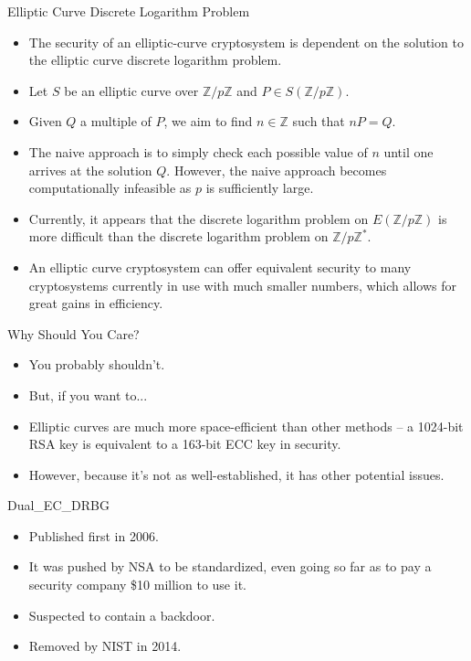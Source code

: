 \documentclass{beamer}
\begin{document}
	\begin{frame}{Elliptic Curve Discrete Logarithm Problem}
		\begin{itemize}
			\item The security of an elliptic-curve cryptosystem is dependent on the solution to the elliptic curve discrete logarithm problem.
			\item Let $S$ be an elliptic curve over $\mathbb{Z}/p\mathbb{Z}$ and $P \in S(\mathbb{Z}/p\mathbb{Z})$.
			\item Given $Q$ a multiple of $P$, we aim to find $n\in\mathbb{Z}$ such that $nP=Q$.
			\item The naive approach is to simply check each possible value of $n$ until one arrives at the solution $Q$. However, the naive approach becomes computationally infeasible as $p$ is sufficiently large.
			\item Currently, it appears that the discrete logarithm problem on $E(\mathbb{Z}/p\mathbb{Z})$ is more difficult than the discrete logarithm problem on $\mathbb{Z}/p\mathbb{Z}^*$.
			\item An elliptic curve cryptosystem can offer equivalent security to many cryptosystems currently in use with much smaller numbers, which allows for great gains in efficiency.
		\end{itemize}
	\end{frame}
	
	\begin{frame}{Why Should You Care?}
		\begin{itemize}
			\item You probably shouldn't.
			\item But, if you want to...
			\item Elliptic curves are much more space-efficient than other methods -- a 1024-bit RSA key is equivalent to a 163-bit ECC key in security.
			\item However, because it's not as well-established, it has other potential issues.
		\end{itemize}
	\end{frame}
	
	\begin{frame}{Dual\_EC\_DRBG}
		\begin{itemize}
			\item Published first in 2006.
			\item It was pushed by NSA to be standardized, even going so far as to pay a security company \$10 million to use it.
			\item Suspected to contain a backdoor.
			\item Removed by NIST in 2014.
		\end{itemize}
	\end{frame}
	
\end{document}
